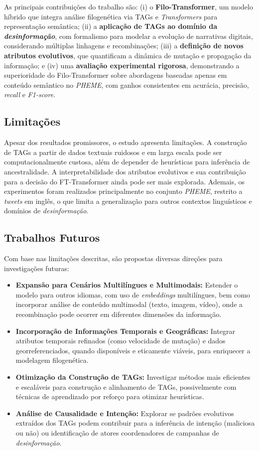 \documentclass[12pt]{article}
\begin{document}
As principais contribuições do trabalho são: (i) o \textbf{Filo-Transformer}, um modelo híbrido que integra análise filogenética via TAGs e \textit{Transformers} para representação semântica; (ii) a \textbf{aplicação de TAGs ao domínio da \textit{desinformação}}, com formalismo para modelar a evolução de narrativas digitais, considerando múltiplas linhagens e recombinações; (iii) a \textbf{definição de novos atributos evolutivos}, que quantificam a dinâmica de mutação e propagação da informação; e (iv) uma \textbf{avaliação experimental rigorosa}, demonstrando a superioridade do Filo-Transformer sobre abordagens baseadas apenas em conteúdo semântico no \textit{PHEME}, com ganhos consistentes em acurácia, precisão, \textit{recall} e \textit{F1-score}.

\subsection{Limitações}
Apesar dos resultados promissores, o estudo apresenta limitações. A construção de TAGs a partir de dados textuais ruidosos e em larga escala pode ser computacionalmente custosa, além de depender de heurísticas para inferência de ancestralidade. A interpretabilidade dos atributos evolutivos e sua contribuição para a decisão do FT-Transformer ainda pode ser mais explorada. Ademais, os experimentos foram realizados principalmente no conjunto \textit{PHEME}, restrito a \textit{tweets} em inglês, o que limita a generalização para outros contextos linguísticos e domínios de \textit{desinformação}.

\subsection{Trabalhos Futuros}
Com base nas limitações descritas, são propostas diversas direções para investigações futuras:
\begin{itemize}
    \item \textbf{Expansão para Cenários Multilíngues e Multimodais:} Estender o modelo para outros idiomas, com uso de \textit{embeddings} multilíngues, bem como incorporar análise de conteúdo multimodal (texto, imagem, vídeo), onde a recombinação pode ocorrer em diferentes dimensões da informação.
    \item \textbf{Incorporação de Informações Temporais e Geográficas:} Integrar atributos temporais refinados (como velocidade de mutação) e dados georreferenciados, quando disponíveis e eticamente viáveis, para enriquecer a modelagem filogenética.
    \item \textbf{Otimização da Construção de TAGs:} Investigar métodos mais eficientes e escaláveis para construção e alinhamento de TAGs, possivelmente com técnicas de aprendizado por reforço para otimizar heurísticas.
    \item \textbf{Análise de Causalidade e Intenção:} Explorar se padrões evolutivos extraídos dos TAGs podem contribuir para a inferência de intenção (maliciosa ou não) ou identificação de atores coordenadores de campanhas de \textit{desinformação}.
\end{itemize}
\end{document}
